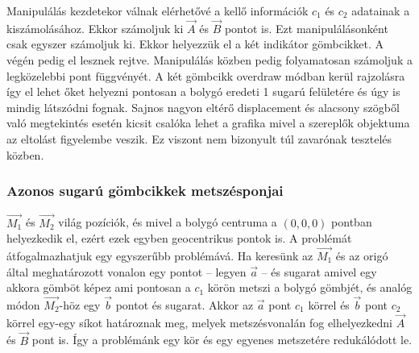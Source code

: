 Manipulálás kezdetekor válnak elérhetővé a kellő információk $c_1$ és $c_2$ adatainak a kiszámolásához. Ekkor számoljuk ki $\overrightarrow{A}$ és $\overrightarrow{B}$ pontot is. Ezt manipulálásonként csak egyszer számoljuk ki. Ekkor helyezzük el a két indikátor gömbcikket. A végén pedig el lesznek rejtve. Manipulálás közben pedig folyamatosan számoljuk a legközelebbi pont függvényét. A két gömbcikk overdraw módban kerül rajzolásra így el lehet őket helyezni pontosan a bolygó eredeti 1 sugarú felületére és úgy is mindig látszódni fognak. Sajnos nagyon eltérő displacement és alacsony szögből való megtekintés esetén kicsit csalóka lehet a grafika mivel a szereplők objektuma az eltolást figyelembe veszik. Ez viszont nem bizonyult túl zavarónak tesztelés közben.

\subsubsection{Azonos sugarú gömbcikkek metszésponjai}

$\overrightarrow{M_1}$ és $\overrightarrow{M_2}$ világ pozíciók, és mivel a bolygó centruma a $(0, 0, 0)$ pontban helyezkedik el, ezért ezek egyben geocentrikus pontok is. A problémát átfogalmazhatjuk egy egyszerűbb problémává. Ha keresünk az $\overrightarrow{M_1}$ és az origó által meghatározott vonalon egy pontot -- legyen $\overrightarrow{a}$ -- és sugarat amivel egy akkora gömböt képez ami pontosan a $c_1$ körön metszi a bolygó gömbjét, és analóg módon $\overrightarrow{M_2}$-höz egy $\overrightarrow{b}$ pontot és sugarat. Akkor az $\overrightarrow{a}$ pont $c_1$ körrel és $\overrightarrow{b}$ pont $c_2$ körrel egy-egy síkot határoznak meg, melyek metszésvonalán fog elhelyezkedni $\overrightarrow{A}$ és $\overrightarrow{B}$ pont is. Így a problémánk egy kör és egy egyenes metszetére redukálódott le.

